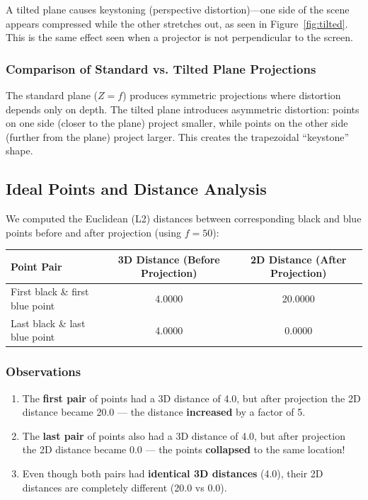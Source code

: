 \documentclass[12pt]{article}
\begin{document}
A tilted plane causes keystoning (perspective distortion)---one side of the scene appears compressed while the other stretches out, as seen in Figure~\ref{fig:tilted}. This is the same effect seen when a projector is not perpendicular to the screen.

\subsubsection*{Comparison of Standard vs. Tilted Plane Projections}

The standard plane ($Z = f$) produces symmetric projections where distortion depends only on depth. The tilted plane introduces asymmetric distortion: points on one side (closer to the plane) project smaller, while points on the other side (further from the plane) project larger. This creates the trapezoidal ``keystone'' shape.

\subsection*{Ideal Points and Distance Analysis}

We computed the Euclidean (L2) distances between corresponding black and blue points before and after projection (using $f = 50$):

\begin{center}
\begin{tabular}{|l|c|c|}
\hline
\textbf{Point Pair} & \textbf{3D Distance (Before Projection)} & \textbf{2D Distance (After Projection)} \\
\hline
First black \& first blue point & 4.0000 & 20.0000 \\
\hline
Last black \& last blue point & 4.0000 & 0.0000 \\
\hline
\end{tabular}
\end{center}

\subsubsection*{Observations}

\begin{enumerate}
    \item The \textbf{first pair} of points had a 3D distance of 4.0, but after projection the 2D distance became 20.0 --- the distance \textbf{increased} by a factor of 5.
    \item The \textbf{last pair} of points also had a 3D distance of 4.0, but after projection the 2D distance became 0.0 --- the points \textbf{collapsed} to the same location!
    \item Even though both pairs had \textbf{identical 3D distances} (4.0), their 2D distances are completely different (20.0 vs 0.0).
\end{enumerate}
\end{document}
